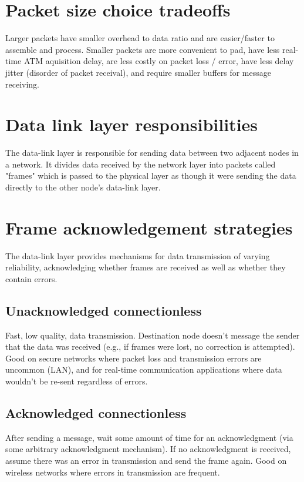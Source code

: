 
\section{Packet size choice tradeoffs}

Larger packets have smaller overhead to data ratio and are easier/faster to assemble and process. Smaller packets are more convenient to pad, have less real-time ATM aquisition delay, are less costly on packet loss / error, have less delay jitter (disorder of packet receival), and require smaller buffers for message receiving.

\section{Data link layer responsibilities}

The data-link layer is responsible for sending data between two adjacent nodes in a network. It divides data received by the network layer into packets called "frames" which is passed to the physical layer as though it were sending the data directly to the other node's data-link layer. 

\section{Frame acknowledgement strategies}
The data-link layer provides mechanisms for data transmission of varying reliability, acknowledging whether frames are received as well as whether they contain errors. 

\subsection{Unacknowledged connectionless}

Fast, low quality, data transmission. Destination node doesn't message the sender that the data was received (e.g., if frames were lost, no correction is attempted). Good on secure networks where packet loss and transmission errors are uncommon (LAN), and for real-time communication applications where data wouldn't be re-sent regardless of errors.  

\subsection{Acknowledged connectionless}

After sending a message, wait some amount of time for an acknowledgment (via some arbitrary acknowledgment mechanism). If no acknowledgment is received, assume there was an error in transmission and send the frame again. Good on wireless networks where errors in transmission are frequent.

